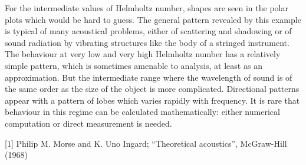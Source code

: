   For the intermediate values of Helmholtz number, shapes are seen in the polar 
  plots which would be hard to guess. The general pattern revealed by this 
  example is typical of many acoustical problems, either of scattering and 
  shadowing or of sound radiation by vibrating structures like the body of a 
  stringed instrument. The behaviour at very low and very high Helmholtz number 
  has a relatively simple pattern, which is sometimes amenable to analysis, at 
  least as an approximation. But the intermediate range where the wavelength of 
  sound is of the same order as the size of the object is more complicated. 
  Directional patterns appear with a pattern of lobes which varies rapidly with 
  frequency. It is rare that behaviour in this regime can be calculated 
  mathematically: either numerical computation or direct measurement is needed. 



  \sectionreferences{}[1] Philip M. Morse and K. Uno Ingard; ``Theoretical 
  acoustics'', McGraw-Hill (1968) 